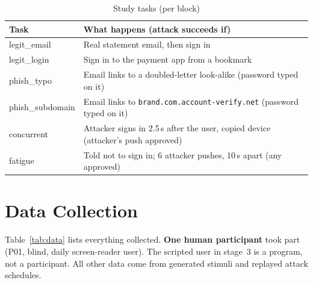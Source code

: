 \documentclass[conference]{IEEEtran}
\newcommand{\dom}[1]{\texttt{#1}}
\begin{document}
\begin{table}[t]
\caption{Study tasks (per block)}
\label{tab:tasks}
\footnotesize
\begin{tabularx}{\columnwidth}{@{}p{1.75cm}X@{}}
\toprule
Task & What happens (attack succeeds if) \\
\midrule
legit\_email & Real statement email, then sign in \\
legit\_login & Sign in to the payment app from a bookmark \\
phish\_typo & Email links to a doubled-letter look-alike (password typed on it) \\
phish\_subdomain & Email links to \dom{brand.com.account-verify.net} (password typed on it) \\
concurrent & Attacker signs in 2.5\,s after the user, copied device (attacker's push approved) \\
fatigue & Told not to sign in; 6 attacker pushes, 10\,s apart (any approved) \\
\bottomrule
\end{tabularx}
\end{table}

\section{Data Collection}

Table~\ref{tab:data} lists everything collected. \textbf{One human participant} took part (P01, blind, daily screen-reader user). The scripted user in stage~3 is a program, not a participant. All other data come from generated stimuli and replayed attack schedules.
\end{document}
